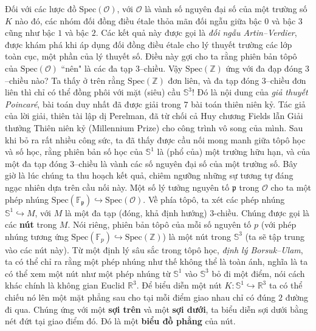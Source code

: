 \begin{multicols}{2}
	\vskip 0.1cm
	Đối với các lược đồ $\text{Spec}(\mathcal{O})$, với $\mathcal{O}$ là vành số nguyên đại số của một trường số $K$ nào đó, các nhóm đối đồng điều étale thỏa mãn đối ngẫu giữa bậc $0$ và bậc $3$ cũng như bậc $1$ và bậc $2$. Các kết quả này được gọi là {\it đối ngẫu Artin--Verdier}, được khám phá khi áp dụng đối đồng điều étale cho lý thuyết trường các lớp toàn cục, một phần của lý thuyết số. Điều này gợi cho ta rằng phiên bản tôpô của $\text{Spec}(\mathcal{O})$ ``nên" là các đa tạp $3$--chiều. Vậy $\text{Spec}(\mathbb{Z})$ ứng với đa đạp đóng $3$--chiều nào? Ta thấy ở trên rằng $\text{Spec}(\mathbb{Z})$ đơn liên, và đa tạp đóng $3$--chiều đơn liên thì chỉ có thể đồng phôi với mặt (siêu) cầu  $\mathbb{S}^3$! Đó là nội dung của {\it giả thuyết Poincaré}, bài toán duy nhất đã được giải trong $7$ bài toán thiên niên kỷ. Tác giả của lời giải, thiên tài lập dị Perelman, đã từ chối cả Huy chương Fields lẫn Giải thưởng Thiên niên kỷ (Millennium Prize) cho công trình vô song của mình.
	\vskip 0.1cm
	Sau khi bỏ ra rất nhiều công sức, ta đã thấy được cầu nối mong manh giữa tôpô học và số học, rằng phiên bản số học của $\mathbb{S}^1$ là (phổ của) một trường hữu hạn, và của một đa tạp đóng $3$--chiều là vành các số nguyên đại số của một trường số. Bây giờ là lúc chúng ta thu hoạch kết quả, chiêm ngưỡng những sự tương tự đáng ngạc nhiên dựa trên cầu nối này. Một số lý tưởng nguyên tố $\mathfrak{p}$ trong $\mathcal{O}$ cho ta một phép nhúng $\text{Spec}(\mathbb{F}_\mathfrak{p}) \hookrightarrow \text{Spec}(\mathcal{O})$. Về phía tôpô, ta xét các phép nhúng $\mathbb{S}^1 \hookrightarrow M$, với $M$ là một đa tạp (đóng, khả định hướng) $3$-chiều. Chúng được gọi là các {\bf\color{duongvaotoanhoc} nút} trong $M$. Nói riêng, phiên bản tôpô của mỗi số nguyên tố $p$ (với phép nhúng tương ứng $\text{Spec}(\mathbb{F}_p) \hookrightarrow \text{Spec}(\mathbb{Z})$) là một nút trong $\mathbb{S}^3$ (ta sẽ tập trung vào các nút này). Từ một định lý sâu sắc trong tôpô học, {\it định lý Borsuk--Ulam}, ta có thể chỉ ra rằng một phép nhúng như thế không thể là toàn ánh, nghĩa là ta có thể xem một nút như một phép nhúng từ $\mathbb{S}^1$ vào $\mathbb{S}^3$ bỏ đi một điểm, nói cách khác chính là không gian Euclid $\mathbb{R}^3$.
	\vskip 0.1cm
	Để biểu diễn một nút $K: \mathbb{S}^1 \hookrightarrow \mathbb{R}^3$ ta có thể chiếu nó lên một mặt phẳng sau cho tại mỗi điểm giao nhau chỉ có đúng $2$ đường đi qua. Chúng ứng với một {\bf\color{duongvaotoanhoc} sợi trên} và một {\bf\color{duongvaotoanhoc} sợi dưới}, ta biểu diễn sợi dưới bằng nét đứt tại giao điểm đó.  Đó là một {\bf\color{duongvaotoanhoc} biểu đồ phẳng} của nút.

\end{multicols}
